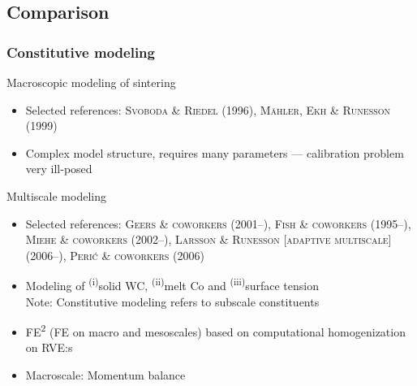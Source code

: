 \documentclass[11pt]{beamer} %
\newcommand{\roughcite}[1]{\textsc{#1}}
\begin{document}
\subsection{Comparison}
\begin{frame}
 \frametitle{Constitutive modeling}
 Macroscopic modeling of sintering
 \begin{itemize}
  \item Selected references: \roughcite{Svoboda \& Riedel (1996)}, \roughcite{Mähler, Ekh \& Runesson (1999)}
  \item Complex model structure, requires many parameters --- calibration problem very ill-posed
 \end{itemize}

 Multiscale modeling
 \begin{itemize}
  \item Selected references:  \roughcite{Geers \& coworkers (2001--)},
 \roughcite{Fish \& coworkers (1995--)},
 \roughcite{Miehe \& coworkers (2002--)},
 \roughcite{Larsson \& Runesson [adaptive multiscale] (2006--)}, \roughcite{Perić \& coworkers (2006)}
  \item Modeling of \textsuperscript{(i)}solid WC, \textsuperscript{(ii)}melt Co and \textsuperscript{(iii)}surface tension\\
  Note: Constitutive modeling refers to subscale constituents
  \item FE\textsuperscript{2} (FE on macro and mesoscales) based on computational homogenization on RVE:s
  \item Macroscale: Momentum balance
 \end{itemize}
\end{frame}

\end{document}
